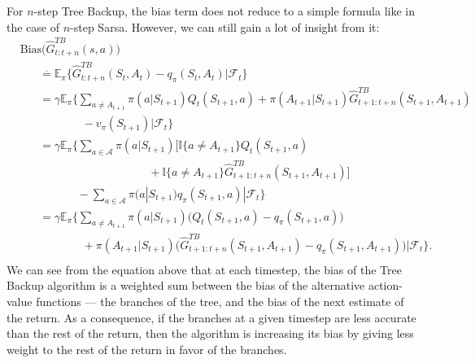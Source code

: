 For $n$-step Tree Backup, the bias term does not reduce to a simple formula like in the case of $n$-step Sarsa. 
However, we can still gain a lot of insight from it:
\begin{align}
\label{eq:treebackup_bias}
    & \text{Bias}\big(  \hat{G}^{TB}_{t:t+n}(s, a)  \big) 
        \nonumber \\
    & \hspace{20pt} \overset{.}{=}
        \mathbb{E}_\pi \{ \hat{G}^{TB}_{t:t+n}(S_t, A_t) - q_\pi (S_t, A_t) | \mathcal{F}_t \} 
        \nonumber \\
    & \hspace{20pt} =
        \gamma \mathbb{E}_\pi \Big\{
        \sum_{a \neq A_{t+1}} \pi(a|S_{t+1})  Q_t(S_{t+1}, a)
        + \pi(A_{t+1}|S_{t+1}) \hat{G}^{TB}_{t+1:t+n}(S_{t+1}, A_{t+1}) 
        \nonumber \\
    & \hspace{65pt}
        - v_\pi (S_{t+1}) | \mathcal{F}_t \Big\} 
        \nonumber \\
    & \hspace{20pt} =
        \gamma \mathbb{E}_\pi \Big\{
        \sum_{a \in \mathcal{A}} \pi(a|S_{t+1}) \big[ \mathbb{I}\{ a \neq A_{t+1} \} Q_t(S_{t+1}, a) 
        \nonumber \\
    & \hspace{135pt}
        + \mathbb{I}\{ a \neq A_{t+1} \}  \hat{G}^{TB}_{t+1:t+n}(S_{t+1}, A_{t+1}) \big]
        \nonumber \\
    & \hspace{60pt}
        - \sum_{a \in \mathcal{A}} \pi(a|S_{t+1}) q_\pi(S_{t+1}, a) | \mathcal{F}_t \Big\} 
        \nonumber \\
    & \hspace{20pt} =
        \gamma \mathbb{E}_\pi \Big\{
        \sum_{a \neq A_{t+1}} \pi(a|S_{t+1}) \big( Q_t(S_{t+1}, a) - q_\pi(S_{t+1}, a) \big)
        \nonumber \\
    & \hspace{65pt}
        + \pi(A_{t+1}|S_{t+1}) \big( \hat{G}^{TB}_{t+1:t+n}(S_{t+1}, A_{t+1}) 
        - q_\pi(S_{t+1}, A_{t+1}) \big)
        \Big| \mathcal{F}_t \Big\}.
        \nonumber \\
\end{align}
%
We can see from the equation above that at each timestep, the bias of the Tree Backup algorithm is a weighted sum between the bias of the alternative action-value functions --- the branches of the tree, and the bias of the next estimate of the return.
As a consequence, if the branches at a given timestep are less accurate than the rest of the return, then the algorithm is increasing its bias by giving less weight to the rest of the return in favor of the branches.

